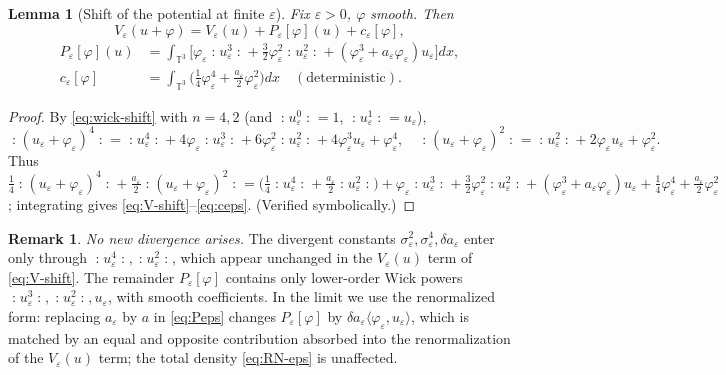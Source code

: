 \documentclass[12pt]{article}
\newcommand{\bT}{\mathbb{T}}
\newcommand{\eps}{\varepsilon}
\newcommand{\Wick}[1]{\mathopen{:}#1\mathclose{:}}
\theoremstyle{plain}
\newtheorem{lemma}{Lemma}
\theoremstyle{definition}
\newtheorem{remark}{Remark}
\begin{document}
\begin{lemma}[Shift of the potential at finite $\eps$]\label{lem:V-shift}
Fix $\eps>0$, $\varphi$ smooth. Then
\begin{equation}\label{eq:V-shift}
V_\eps(u+\varphi)=V_\eps(u)+P_\eps[\varphi](u)+c_\eps[\varphi],
\end{equation}
\begin{align}
P_\eps[\varphi](u)&=\int_{\bT^3}\Big[\varphi_\eps\Wick{u_\eps^3}
+\tfrac32\varphi_\eps^2\Wick{u_\eps^2}
+(\varphi_\eps^3+a_\eps\varphi_\eps)u_\eps\Big]dx, \label{eq:Peps}\\
c_\eps[\varphi]&=\int_{\bT^3}\Big(\tfrac14\varphi_\eps^4+\tfrac{a_\eps}{2}\varphi_\eps^2\Big)dx
\quad(\text{deterministic}). \label{eq:ceps}
\end{align}
\end{lemma}

\begin{proof}
By \eqref{eq:wick-shift} with $n=4,2$ (and $\Wick{u_\eps^0}=1$, $\Wick{u_\eps^1}=u_\eps$),
\[
\Wick{(u_\eps+\varphi_\eps)^4}=\Wick{u_\eps^4}+4\varphi_\eps\Wick{u_\eps^3}
+6\varphi_\eps^2\Wick{u_\eps^2}+4\varphi_\eps^3 u_\eps+\varphi_\eps^4,\quad
\Wick{(u_\eps+\varphi_\eps)^2}=\Wick{u_\eps^2}+2\varphi_\eps u_\eps+\varphi_\eps^2 .
\]
Thus $\tfrac14\Wick{(u_\eps+\varphi_\eps)^4}+\tfrac{a_\eps}{2}\Wick{(u_\eps+\varphi_\eps)^2}
=\big(\tfrac14\Wick{u_\eps^4}+\tfrac{a_\eps}2\Wick{u_\eps^2}\big)
+\varphi_\eps\Wick{u_\eps^3}+\tfrac32\varphi_\eps^2\Wick{u_\eps^2}
+(\varphi_\eps^3+a_\eps\varphi_\eps)u_\eps+\tfrac14\varphi_\eps^4+\tfrac{a_\eps}2\varphi_\eps^2$;
integrating gives \eqref{eq:V-shift}--\eqref{eq:ceps}. (Verified symbolically.)
\end{proof}

\begin{remark}\label{rem:counterterm}
\emph{No new divergence arises.} The divergent constants $\sigma_\eps^2,\sigma_\eps^4,
\delta a_\eps$ enter only through $\Wick{u_\eps^4},\Wick{u_\eps^2}$, which appear
unchanged in the $V_\eps(u)$ term of \eqref{eq:V-shift}. The remainder
$P_\eps[\varphi]$ contains only lower-order Wick powers
$\Wick{u_\eps^3},\Wick{u_\eps^2},u_\eps$, with smooth coefficients. In the limit we
use the renormalized form: replacing $a_\eps$ by $a$ in \eqref{eq:Peps} changes
$P_\eps[\varphi]$ by $\delta a_\eps\langle\varphi_\eps,u_\eps\rangle$, which is
matched by an equal and opposite contribution absorbed into the renormalization of
the $V_\eps(u)$ term; the total density \eqref{eq:RN-eps} is unaffected.
\end{remark}
\end{document}
